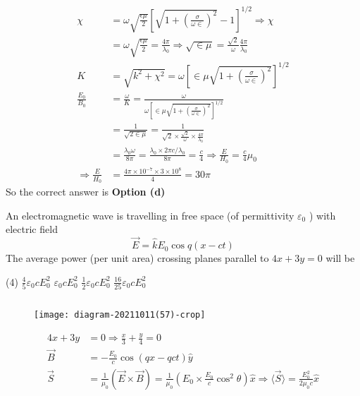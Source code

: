 \begin{enumerate}
\begin{answer}
\begin{align*}
	\chi&=\omega \sqrt{\frac{\epsilon \mu}{2}}\left[\sqrt{1+\left(\frac{\sigma}{\omega \in}\right)^{2}}-1\right]^{1 / 2} \Rightarrow \chi\\&=\omega \sqrt{\frac{\epsilon \mu}{2}}=\frac{4 \pi}{\lambda_{0}} \Rightarrow \sqrt{\in \mu}=\frac{\sqrt{2}}{\omega} \frac{4 \pi}{\lambda_{0}}\\
	K&=\sqrt{k^{2}+\chi^{2}}=\omega\left[\in \mu \sqrt{1+\left(\frac{\sigma}{\omega \in}\right)^{2}}\right]^{1 / 2}\\
	\frac{E_{0}}{B_{0}}&=\frac{\omega}{K}=\frac{\omega}{\omega\left[\in \mu \sqrt{1+\left(\frac{\sigma}{\omega \in}\right)^{2}}\right]^{1 / 2}}\\&=\frac{1}{\sqrt{2 \in \mu}}=\frac{1}{\sqrt{2} \times \frac{\sqrt{2}}{\omega} \times \frac{4 \pi}{\lambda_{0}}}\\
	&=\frac{\lambda_{0} \omega}{8 \pi}=\frac{\lambda_{0} \times 2 \pi c / \lambda_{0}}{8 \pi}=\frac{c}{4} \Rightarrow \frac{E}{H_{0}}=\frac{c}{4} \mu_{0}\\
	\Rightarrow \frac{E}{H_{0}}&=\frac{4 \pi \times 10^{-7} \times 3 \times 10^{8}}{4}=30 \pi
	\end{align*}
	So the correct answer is \textbf{Option (d)}
\end{answer}
	\begin{minipage}{\textwidth}
		\item An electromagnetic wave is travelling in free space (of permittivity $\varepsilon_{0}$ ) with electric field
		$$
		\vec{E}=\hat{k} E_{0} \cos q(x-c t)
		$$
		The average power (per unit area) crossing planes parallel to $4 x+3 y=0$ will be
	\end{minipage}
	\begin{tasks}(4)
		\task[\textbf{a.}] $\frac{4}{5} \varepsilon_{0} c E_{0}^{2}$
		\task[\textbf{b.}]$\varepsilon_{0} c E_{0}^{2}$
		\task[\textbf{c.}]$\frac{1}{2} \varepsilon_{0} c E_{0}^{2}$
		\task[\textbf{d.}] $\frac{16}{25} \varepsilon_{0} c E_{0}^{2}$
	\end{tasks}
	\begin{answer}$\left. \right. $
		\begin{figure}[H]
			\centering
			\texttt{[image: diagram-20211011(57)-crop]}
		\end{figure}
		\begin{align*}
		4 x+3 y&=0 \Rightarrow \frac{x}{3}+\frac{y}{4}=0\\
		\vec{B}&=-\frac{E_{0}}{c} \cos (q x-q c t) \hat{y}\\
		\vec{S}&=\frac{1}{\mu_{0}}(\vec{E} \times \vec{B})=\frac{1}{\mu_{0}}\left(E_{0} \times \frac{E_{0}}{c} \cos ^{2} \theta\right) \hat{x} \Rightarrow\langle\vec{S}\rangle=\frac{E_{0}^{2}}{2 \mu_{0} c} \hat{x}\\

\end{align*}
\end{answer}
\end{enumerate}
